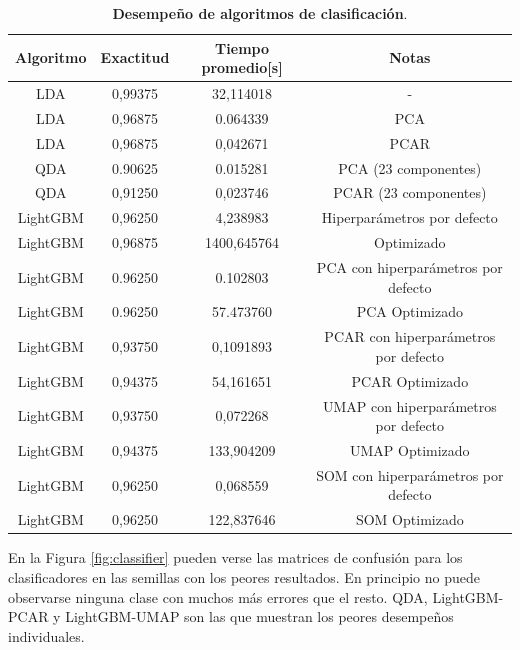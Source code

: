 \documentclass[12pt]{article}
\begin{document}
\begin{table}[htbp]
\centering
\begin{tabular}{|c|c|c|c|}
\hline
Algoritmo  & Exactitud & Tiempo promedio[s] & Notas \\ \hline
LDA      & 0,99375   & 32,114018     & - \\ \hline
LDA      & 0,96875   & 0.064339     & PCA \\ \hline
LDA      & 0,96875   & 0,042671     & PCAR \\ \hline
QDA      & 0.90625   & 0.015281     & PCA (23 componentes) \\ \hline
QDA      & 0,91250   & 0,023746     & PCAR (23 componentes)\\ \hline
LightGBM & 0,96250   & 4,238983     & Hiperparámetros por defecto \\ \hline
LightGBM & 0,96875   & 1400,645764  & Optimizado \\ \hline
LightGBM & 0.96250   & 0.102803     & PCA con hiperparámetros por defecto \\ \hline
LightGBM & 0.96250   & 57.473760  & PCA Optimizado \\ \hline
LightGBM & 0,93750   & 0,1091893     & PCAR con hiperparámetros por defecto \\ \hline
LightGBM & 0,94375   & 54,161651  & PCAR Optimizado \\ \hline
LightGBM & 0,93750   & 0,072268     & UMAP con hiperparámetros por defecto \\ \hline
LightGBM & 0,94375   & 133,904209  & UMAP Optimizado \\ \hline
LightGBM & 0,96250   & 0,068559     & SOM con hiperparámetros por defecto \\ \hline
LightGBM & 0,96250   & 122,837646  & SOM Optimizado \\ \hline

\end{tabular}
\caption{\textbf{Desempeño de algoritmos de clasificación}.}
\label{table:classifier}
\end{table}

En la Figura \ref{fig:classifier} pueden verse las matrices de confusión para los clasificadores en las semillas con los peores resultados. En principio no puede observarse ninguna clase con muchos más errores que el resto. QDA, LightGBM-PCAR y LightGBM-UMAP son las que muestran los peores desempeños individuales.
\end{document}
